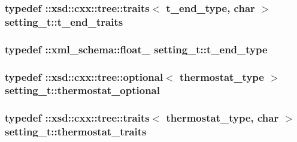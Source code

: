 \subsubsection[{\texorpdfstring{t\+\_\+end\+\_\+traits}{t_end_traits}}]{\setlength{\rightskip}{0pt plus 5cm}typedef \+::xsd\+::cxx\+::tree\+::traits$<$ {\bf t\+\_\+end\+\_\+type}, char $>$ {\bf setting\+\_\+t\+::t\+\_\+end\+\_\+traits}}\hypertarget{classsetting__t_ab0900ed5312404537577df0234ed3239}{}\label{classsetting__t_ab0900ed5312404537577df0234ed3239}
\subsubsection[{\texorpdfstring{t\+\_\+end\+\_\+type}{t_end_type}}]{\setlength{\rightskip}{0pt plus 5cm}typedef \+::{\bf xml\+\_\+schema\+::float\+\_\+} {\bf setting\+\_\+t\+::t\+\_\+end\+\_\+type}}\hypertarget{classsetting__t_ab27962fdbca01941c3b6c632bc7ac360}{}\label{classsetting__t_ab27962fdbca01941c3b6c632bc7ac360}
\subsubsection[{\texorpdfstring{thermostat\+\_\+optional}{thermostat_optional}}]{\setlength{\rightskip}{0pt plus 5cm}typedef \+::xsd\+::cxx\+::tree\+::optional$<$ {\bf thermostat\+\_\+type} $>$ {\bf setting\+\_\+t\+::thermostat\+\_\+optional}}\hypertarget{classsetting__t_a0e8b6cd8315d18962e1e25dea062eb1d}{}\label{classsetting__t_a0e8b6cd8315d18962e1e25dea062eb1d}
\subsubsection[{\texorpdfstring{thermostat\+\_\+traits}{thermostat_traits}}]{\setlength{\rightskip}{0pt plus 5cm}typedef \+::xsd\+::cxx\+::tree\+::traits$<$ {\bf thermostat\+\_\+type}, char $>$ {\bf setting\+\_\+t\+::thermostat\+\_\+traits}}\hypertarget{classsetting__t_a06272ec2e9d434de40e09e27cc54cd13}{}\label{classsetting__t_a06272ec2e9d434de40e09e27cc54cd13}
